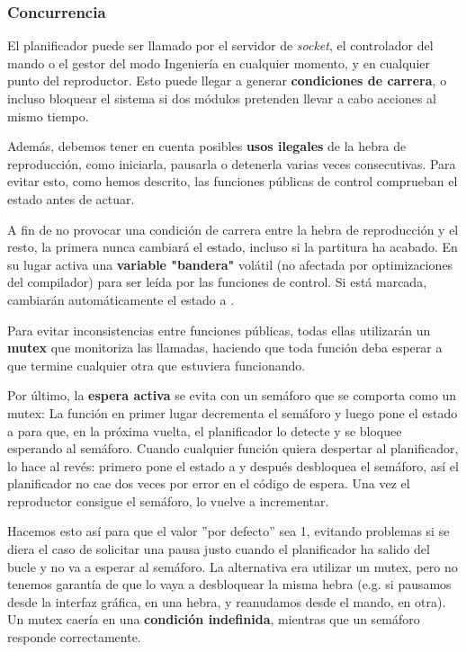 \subsubsection{Concurrencia}

El planificador puede ser llamado por el servidor de \textit{socket}, el controlador del mando o el gestor del modo Ingeniería en cualquier momento, y en cualquier punto del reproductor. Esto puede llegar a generar \textbf{condiciones de carrera}, o incluso bloquear el sistema si dos módulos pretenden llevar a cabo acciones al mismo tiempo.

Además, debemos tener en cuenta posibles \textbf{usos ilegales} de la hebra de reproducción, como iniciarla, pausarla o detenerla varias veces consecutivas. Para evitar esto, como hemos descrito, las funciones públicas de control comprueban el estado antes de actuar.

A fin de no provocar una condición de carrera entre la hebra de reproducción y el resto, la primera nunca cambiará el estado, incluso si la partitura ha acabado. En su lugar activa una \textbf{variable "bandera"} volátil (no afectada por optimizaciones del compilador) para ser leída por las funciones de control. Si está marcada, cambiarán automáticamente el estado a .

Para evitar inconsistencias entre funciones públicas, todas ellas utilizarán un \textbf{\acrshort{mutex}} que monitoriza las llamadas, haciendo que toda función deba esperar a que termine cualquier otra que estuviera funcionando.

Por último, la \textbf{espera activa} se evita con un semáforo que se comporta como un \acrshort{mutex}: La función  en primer lugar decrementa el semáforo y luego pone el estado a  para que, en la próxima vuelta, el planificador lo detecte y se bloquee esperando al semáforo. Cuando cualquier función quiera despertar al planificador, lo hace al revés: primero pone el estado a  y después desbloquea el semáforo, así el planificador no cae dos veces por error en el código de espera. Una vez el reproductor consigue el semáforo, lo vuelve a incrementar. 

Hacemos esto así para que el valor ''por defecto'' sea 1, evitando problemas si se diera el caso de solicitar una pausa justo cuando el planificador ha salido del bucle y no va a esperar al semáforo. La alternativa era utilizar un \acrshort{mutex}, pero no tenemos garantía de que lo vaya a desbloquear la misma hebra (e.g. si pausamos desde la interfaz gráfica, en una hebra, y reanudamos desde el mando, en otra). Un \acrshort{mutex} caería en una \textbf{condición indefinida}, mientras que un semáforo responde correctamente.

